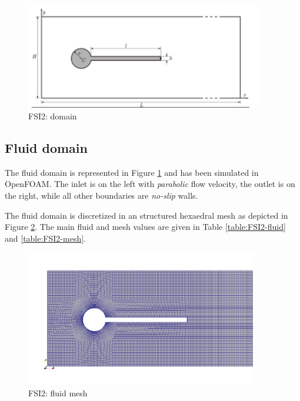 \begin{figure}[htbp!]
	\centering
	\includegraphics[width=0.92\textwidth, trim=0 0 50 0, clip]{images/FSI2/FSI2.png}
	\caption{FSI2: domain}
	\label{fig:fsi2_domain}
\end{figure}

\subsection{Fluid domain}

The fluid domain is represented in Figure \ref{fig:fsi2_domain} and has been simulated in OpenFOAM. The inlet is on the left with \textit{parabolic} flow velocity, the outlet is on the right, while all other boundaries are \textit{no-slip} walls.

The fluid domain is discretized in an structured hexaedral mesh as depicted in Figure \ref{fig:FSI2_mesh}. The main fluid and mesh values are given in Table \ref{table:FSI2-fluid} and \ref{table:FSI2-mesh}. 

\begin{figure}[htbp!]
	\centering
	\includegraphics[width=0.9\textwidth]{images/FSI2/FSI2-mesh.png}
	\caption{FSI2: fluid mesh}
	\label{fig:FSI2_mesh}
\end{figure}


